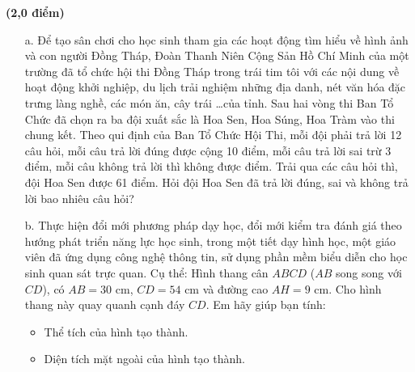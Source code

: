 \begin{ex}%
\textbf{(2,0 điểm)}
\begin{enumerate}
\item[a.] Để tạo sân chơi cho học sinh tham gia các hoạt động tìm hiểu về hình ảnh và con người Đồng Tháp, Đoàn Thanh Niên Cộng Sản Hồ Chí Minh của một trường đã tổ chức hội thi Đồng Tháp trong trái tim tôi với các nội dung về hoạt động khởi nghiệp, du lịch trải nghiệm những địa danh, nét văn hóa đặc trưng làng nghề, các món ăn, cây trái \ldots của tỉnh. Sau hai vòng thi Ban Tổ Chức đã chọn ra ba đội xuất sắc là Hoa Sen, Hoa Súng, Hoa Tràm vào thi chung kết. Theo qui định của Ban Tổ Chức Hội Thi, mỗi đội phải trả lời 12 câu hỏi, mỗi câu trả lời đúng được cộng 10 điểm, mỗi câu trả lời sai trừ 3 điểm, mỗi câu không trả lời thì không được điểm. Trải qua các câu hỏi thì, đội Hoa Sen được 61 điểm. Hỏi đội Hoa Sen đã trả lời đúng, sai và không trả lời bao nhiêu câu hỏi?
\item[b.] Thực hiện đổi mới phương pháp dạy học, đổi mới kiểm tra đánh giá theo hướng phát triển năng lực học sinh, trong một tiết dạy hình học, một giáo viên đã ứng dụng công nghệ thông tin, sử dụng phần mềm biểu diễn cho học sinh quan sát trực quan. Cụ thể: Hình thang cân $ABCD$ ($AB$ song song với $CD$), có $AB=30$ cm, $CD=54$ cm và đường cao $AH=9$ cm. Cho hình thang này quay quanh cạnh đáy $CD$. Em hãy giúp bạn tính:
\begin{itemize}
\item Thể tích của hình tạo thành.
\item Diện tích mặt ngoài của hình tạo thành.
\end{itemize}
\end{enumerate}
\end{ex}


